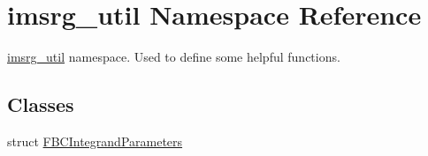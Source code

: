\hypertarget{namespaceimsrg__util}{}\section{imsrg\+\_\+util Namespace Reference}
\label{namespaceimsrg__util}


\hyperlink{namespaceimsrg__util}{imsrg\+\_\+util} namespace. Used to define some helpful functions.  


\subsection*{Classes}
\begin{DoxyCompactItemize}
\item 
struct \hyperlink{structimsrg__util_1_1FBCIntegrandParameters}{F\+B\+C\+Integrand\+Parameters}
\end{DoxyCompactItemize}
